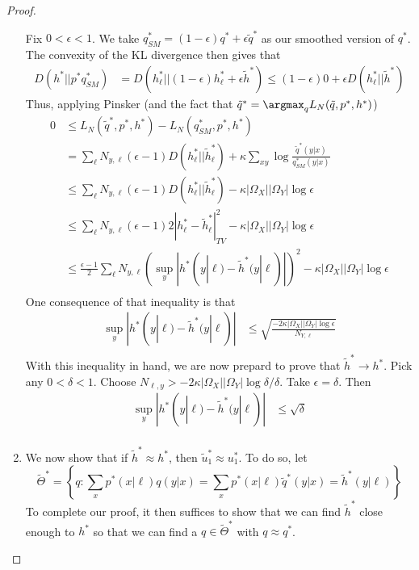 \begin{proof}
\begin{enumerate}
Fix $0<\epsilon<1$. We take
$q^*_{SM}= (1-\epsilon) q^* + \epsilon \tilde q^*$ as our smoothed version of $q^*$.  
The convexity of the KL divergence then gives that
%
\begin{align*}
D(h^* || p^*q^*_{SM})&=D(h^*_{\ell} || (1-\epsilon) h^*_{\ell} + \epsilon \tilde h^*) \leq (1-\epsilon)0 + \epsilon D(h^*_{\ell} || \tilde h^*) 
\end{align*}
%
Thus, applying Pinsker (and the fact that $\tilde q^* = \argmax _q L_N(\tilde q,p^*,h^*)$)
%
\begin{align*}
0 &\leq L_N(\tilde q^*,p^*,h^*) - L_N(q^*_{SM},p^*,h^*)\\
 &= \sum_\ell N_{y,\ell} (\epsilon-1) D(h^*_\ell||\tilde h^*_\ell)+ \kappa \sum_{xy} \log \frac{\tilde q^*(y|x)}{q^*_{SM}(y|x)}\\
&\leq \sum_\ell N_{y,\ell} (\epsilon-1) D(h^*_\ell||\tilde h^*_\ell)- \kappa |\Omega_X||\Omega_Y|\log \epsilon \\
&\leq \sum_\ell N_{y,\ell} (\epsilon-1) 2|h^*_\ell-\tilde h^*_\ell|^2_{TV}- \kappa |\Omega_X||\Omega_Y|\log \epsilon \\
&\leq \frac{\epsilon-1}{2}\sum_\ell N_{y,\ell} \left(\sup_y|h^*(y|\ell)-\tilde h^*(y|\ell)|\right)^2-\kappa |\Omega_X||\Omega_Y|\log \epsilon \\
\end{align*}
%
One consequence of that inequality is that 
%
\begin{align*}
\sup_y|h^*(y|\ell)-\tilde h^*(y|\ell)| &\leq \sqrt{\frac{-2\kappa |\Omega_X||\Omega_Y|\log \epsilon}{N_{Y,\ell}} } \\
\end{align*}
%
With this inequality in hand, we are now prepard to prove that $\tilde h^* \rightarrow h^*$.  Pick any $0<\delta<1$.  
Choose $N_{\ell,y}>-2\kappa |\Omega_X||\Omega_Y|\log \delta/\delta$.  Take $\epsilon=\delta$.  Then
%
\begin{align*}
\sup_y|h^*(y|\ell)-\tilde h^*(y|\ell)| &\leq \sqrt{\delta} \\
\end{align*}

\item We now show that if $\tilde h^*\approx h^*$, then $\tilde u_1^* \approx u_1^*$.  To do so, let
%
\[
\tilde \Theta^* = \left\{q: \sum_x p^*(x|\ell)q(y|x)=\sum_x p^*(x|\ell)\tilde q^*(y|x) = \tilde h^*(y|\ell)\right\} 
\]
%
To complete our proof, it then suffices to show that we can find $\tilde h^*$ close enough to $h^*$ so that
we can find a $q \in \tilde \Theta^*$ with $q \approx q^*$.

\end{enumerate}

\end{proof}

